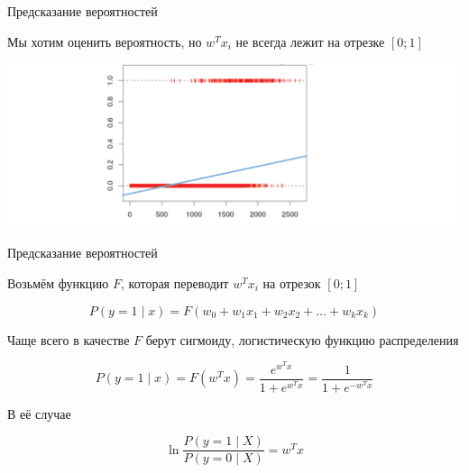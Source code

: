 \documentclass[notes,12pt, aspectratio=169]{beamer}
\newenvironment{wideitemize}{\itemize\addtolength{\itemsep}{10pt}}{\enditemize}
\begin{document}
\begin{frame}{Предсказание вероятностей}

\begin{wideitemize}
	\item Мы хотим оценить вероятность, но $w^T x_i$ не всегда лежит на отрезке $[0;1]$
\end{wideitemize}

\begin{center}
\includegraphics[width=\paperwidth]{logreg_problem.png}
\end{center}
\end{frame}

{
	\begin{frame}
\end{frame}
}

\begin{frame}{Предсказание вероятностей}

\begin{wideitemize}
	\item Возьмём функцию $F$, которая переводит $w^Tx_i$ на отрезок $[0;1]$
	
	\[
		P(y = 1 \mid x) = F(w_0 + w_1 x_1 + w_2 x_2 + \ldots + w_k x_k)
	\]
	
	\item Чаще всего в качестве $F$ берут сигмоиду, логистическую функцию распределения
	
	\[
	P(y = 1 \mid x) = F(w^Tx) = \frac{ e^{w^Tx}}{1 + e^{w^Tx}} = \frac{1}{1 + e^{-w^Tx}}
	\]
	
	\item В её случае 
	
	\[
	\ln \frac{P(y=1 \mid X)}{P(y = 0 \mid X)} = w^Tx
	\]
\end{wideitemize}
\end{frame}
\end{document}
